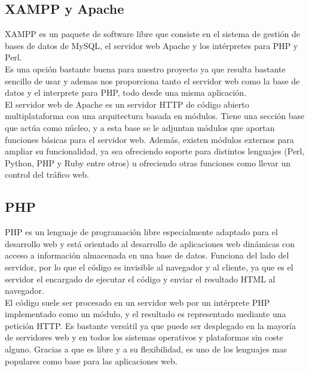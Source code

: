 \clearpage

\subsection{XAMPP y Apache}

XAMPP es un paquete de software libre que consiste en el sistema de gestión de bases de datos de MySQL, el servidor web Apache y los intérpretes para PHP y Perl.\\

Es una opción bastante buena para nuestro proyecto ya que resulta bastante sencillo de usar y ademas nos proporciona tanto el servidor web como la base de datos y el interprete para PHP, todo desde una misma aplicación.\\

El servidor web de Apache es un servidor HTTP de código abierto multiplataforma con una arquitectura basada en módulos. Tiene una sección base que actúa como núcleo, y a esta base se le adjuntan módulos que aportan funciones básicas para el servidor web. Además, existen módulos externos para ampliar su funcionalidad, ya sea ofreciendo soporte para distintos lenguajes (Perl, Python, PHP y Ruby entre otros) u ofreciendo otras funciones como llevar un control del tráfico web.\\

\clearpage

\subsection{PHP}

PHP es un lenguaje de programación libre especialmente adaptado para el desarrollo web y está orientado al desarrollo de aplicaciones web dinámicas con acceso a información almacenada en una base de datos. Funciona del lado del servidor, por lo que el código es invisible al navegador y al cliente, ya que es el servidor el encargado de ejecutar el código y enviar el resultado  HTML al navegador.\\

El código suele ser procesado en un servidor web por un intérprete PHP implementado como un módulo, y el resultado es representado mediante una petición HTTP. Es bastante versátil ya que puede ser desplegado en la mayoría de servidores web y en todos los sistemas operativos y plataformas sin coste alguno. Gracias a que es libre y a su flexibilidad, es uno de los lenguajes mas populares como base para las aplicaciones web.\\

